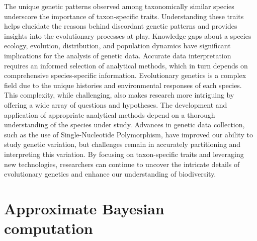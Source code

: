 \documentclass[
]{article}
\begin{document}
The unique genetic patterns observed among taxonomically similar species
underscore the importance of taxon-specific traits. Understanding these
traits helps elucidate the reasons behind discordant genetic patterns
and provides insights into the evolutionary processes at play. Knowledge
gaps about a species\textquotesingle{} ecology, evolution, distribution,
and population dynamics have significant implications for the analysis
of genetic data. Accurate data interpretation requires an informed
selection of analytical methods, which in turn depends on comprehensive
species-specific information. Evolutionary genetics is a complex field
due to the unique histories and environmental responses of each species.
This complexity, while challenging, also makes research more intriguing
by offering a wide array of questions and hypotheses. The development
and application of appropriate analytical methods depend on a thorough
understanding of the species under study. Advances in genetic data
collection, such as the use of Single-Nucleotide Polymorphism, have
improved our ability to study genetic variation, but challenges remain
in accurately partitioning and interpreting this variation. By focusing
on taxon-specific traits and leveraging new technologies, researchers
can continue to uncover the intricate details of evolutionary genetics
and enhance our understanding of biodiversity.

\hypertarget{approximate-bayesian-computation}{%
\section{Approximate Bayesian
computation}\label{approximate-bayesian-computation}}
\end{document}
